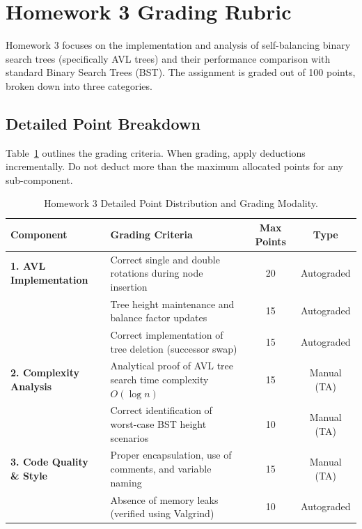 \section{Homework 3 Grading Rubric}
Homework 3 focuses on the implementation and analysis of self-balancing binary search trees (specifically AVL trees) and their performance comparison with standard Binary Search Trees (BST). The assignment is graded out of 100 points, broken down into three categories.

\subsection{Detailed Point Breakdown}
Table~\ref{tab:hw3_rubric} outlines the grading criteria. When grading, apply deductions incrementally. Do not deduct more than the maximum allocated points for any sub-component.

\begin{table}[H]
    \centering
    \small
    \begin{tabularx}{\linewidth}{l X c c}
        \toprule
        \textbf{Component} & \textbf{Grading Criteria} & \textbf{Max Points} & \textbf{Type} \\
        \midrule
        \textbf{1. AVL Implementation} & Correct single and double rotations during node insertion & 20 & Autograded \\
                                      & Tree height maintenance and balance factor updates & 15 & Autograded \\
                                      & Correct implementation of tree deletion (successor swap) & 15 & Autograded \\
        \midrule
        \textbf{2. Complexity Analysis} & Analytical proof of AVL tree search time complexity $O(\log n)$ & 15 & Manual (TA) \\
                                        & Correct identification of worst-case BST height scenarios & 10 & Manual (TA) \\
        \midrule
        \textbf{3. Code Quality \& Style} & Proper encapsulation, use of comments, and variable naming & 15 & Manual (TA) \\
                                          & Absence of memory leaks (verified using Valgrind) & 10 & Autograded \\
        \bottomrule
    \end{tabularx}
    \caption{Homework 3 Detailed Point Distribution and Grading Modality.}
    \label{tab:hw3_rubric}
\end{table}

